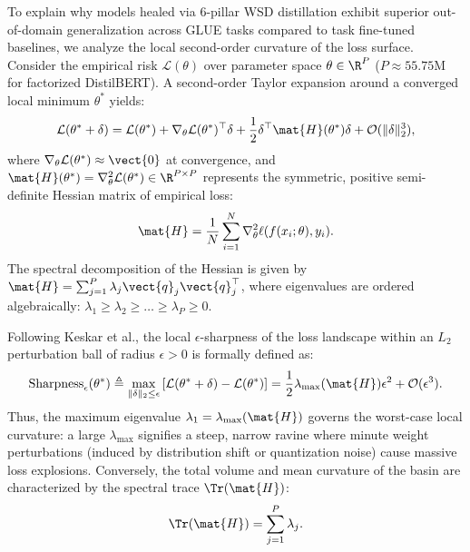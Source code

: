 To explain why models healed via \neuralops{} 6-pillar WSD distillation exhibit superior out-of-domain generalization across GLUE tasks compared to task fine-tuned baselines, we analyze the local second-order curvature of the loss surface. Consider the empirical risk $\mathcal{L}(\theta)$ over parameter space $\theta \in \R^P$ ($P \approx 55.75\text{M}$ for factorized DistilBERT). A second-order Taylor expansion around a converged local minimum $\theta^*$ yields:
\begin{equation}
\mathcal{L}(\theta^* + \delta) = \mathcal{L}(\theta^*) + \nabla_\theta \mathcal{L}(\theta^*)^\top \delta + \frac{1}{2} \delta^\top \mat{H}(\theta^*) \delta + \mathcal{O}(\|\delta\|_2^3),
\label{eq:taylor_expansion}
\end{equation}
where $\nabla_\theta \mathcal{L}(\theta^*) \approx \vect{0}$ at convergence, and $\mat{H}(\theta^*) = \nabla_\theta^2 \mathcal{L}(\theta^*) \in \R^{P \times P}$ represents the symmetric, positive semi-definite Hessian matrix of empirical loss:
\begin{equation}
\mat{H} = \frac{1}{N} \sum_{i=1}^N \nabla_\theta^2 \ell(f(x_i; \theta), y_i).
\label{eq:hessian_definition}
\end{equation}
The spectral decomposition of the Hessian is given by $\mat{H} = \sum_{j=1}^P \lambda_j \vect{q}_j \vect{q}_j^\top$, where eigenvalues are ordered algebraically: $\lambda_1 \ge \lambda_2 \ge \dots \ge \lambda_P \ge 0$.

Following Keskar et al., the local $\epsilon$-sharpness of the loss landscape within an $L_2$ perturbation ball of radius $\epsilon > 0$ is formally defined as:
\begin{equation}
\operatorname{Sharpness}_\epsilon(\theta^*) \triangleq \max_{\|\delta\|_2 \le \epsilon} \left[ \mathcal{L}(\theta^* + \delta) - \mathcal{L}(\theta^*) \right] = \frac{1}{2} \lambda_{\max}(\mat{H}) \epsilon^2 + \mathcal{O}(\epsilon^3).
\label{eq:sharpness_metric}
\end{equation}
Thus, the maximum eigenvalue $\lambda_1 = \lambda_{\max}(\mat{H})$ governs the worst-case local curvature: a large $\lambda_{\max}$ signifies a steep, narrow ravine where minute weight perturbations (induced by distribution shift or quantization noise) cause massive loss explosions. Conversely, the total volume and mean curvature of the basin are characterized by the spectral trace $\Tr(\mat{H})$:
\begin{equation}
\Tr(\mat{H}) = \sum_{j=1}^P \lambda_j.
\label{eq:trace_definition}
\end{equation}

